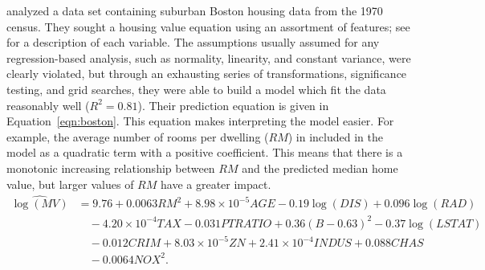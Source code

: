 \documentclass[12pt]{article}
\begin{document}
\citet{harrison-1978-hedonic} analyzed a data set containing suburban Boston housing data from the 1970 census. They sought a housing value equation using an assortment of features; see \citet[Table IV]{harrison-1978-hedonic} for a description of each variable. The assumptions usually assumed for any regression-based analysis, such as normality, linearity, and constant variance, were clearly violated, but through an exhausting series of transformations, significance testing, and grid searches, they were able to build a model which fit the data reasonably well ($R^2 = 0.81$). Their prediction equation is given in Equation~\eqref{eqn:boston}. This equation makes interpreting the model easier. For example, the average number of rooms per dwelling ($RM$) in included in the model as a quadratic term with a positive coefficient. This means that there is a monotonic increasing relationship between $RM$ and the predicted median home value, but larger values of $RM$ have a greater impact.
\begin{equation}
\label{eqn:boston}
\begin{aligned}
\widehat{\log\left(MV\right)} &= 9.76 + 0.0063 RM^2 + 8.98\times10^{-5} AGE - 0.19\log\left(DIS\right) + 0.096\log\left(RAD\right) \\
  & \quad - 4.20\times10^{-4} TAX - 0.031 PTRATIO + 0.36\left(B - 0.63\right)^2 - 0.37\log\left(LSTAT\right) \\
  & \quad - 0.012 CRIM + 8.03\times10^{-5} ZN + 2.41\times10^{-4} INDUS + 0.088 CHAS \\
  & \quad - 0.0064 NOX^2.
\end{aligned}
\end{equation}


\end{document}

